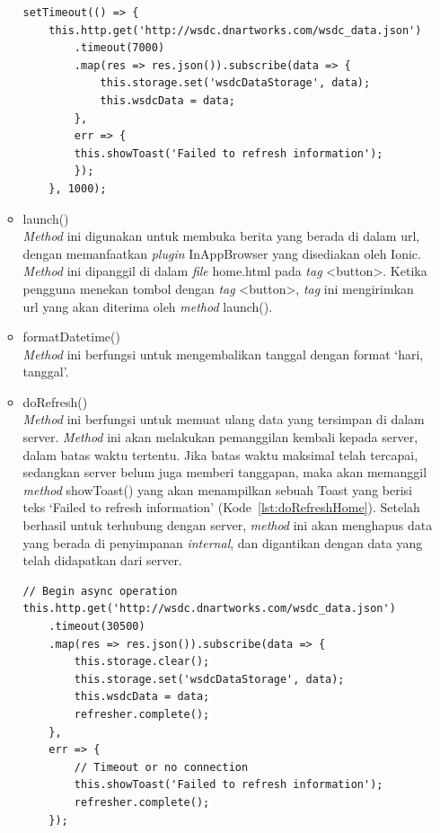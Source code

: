 \begin{itemize}
\begin{itemize}
\newpage		
		
		\begin{lstlisting}[language=html, label={lst:setTimeOutHome}, caption=Perintah setTimeout() pada Home]
setTimeout(() => {
	this.http.get('http://wsdc.dnartworks.com/wsdc_data.json')
		.timeout(7000)
		.map(res => res.json()).subscribe(data => {
       		this.storage.set('wsdcDataStorage', data);
        	this.wsdcData = data;
      	},
      	err => {
        this.showToast('Failed to refresh information');
      	});
    }, 1000);
\end{lstlisting}
		\item launch() \\
		\textit{Method} ini digunakan untuk membuka berita yang berada di dalam url, dengan memanfaatkan \textit{plugin} InAppBrowser yang disediakan oleh Ionic. \textit{Method} ini dipanggil di dalam \textit{file} home.html pada \textit{tag} <button>. Ketika pengguna menekan tombol dengan \textit{tag} <button>, \textit{tag} ini mengirimkan url yang akan diterima oleh \textit{method} launch(). 
		\item formatDatetime() \\
		\textit{Method} ini berfungsi untuk mengembalikan tanggal dengan format `hari, tanggal'.
		\item doRefresh() \\
		\textit{Method} ini berfungsi untuk memuat ulang data yang tersimpan di dalam server. \textit{Method} ini akan melakukan pemanggilan kembali kepada server, dalam batas waktu tertentu. Jika batas waktu maksimal telah tercapai, sedangkan server belum juga memberi tanggapan, maka akan memanggil \textit{method} showToast() yang akan menampilkan sebuah Toast yang berisi teks `Failed to refresh information' (Kode~\ref{lst:doRefreshHome}). Setelah berhasil untuk terhubung dengan server, \textit{method} ini akan menghapus data yang berada di penyimpanan \textit{internal}, dan digantikan dengan data yang telah didapatkan dari server.

\begin{lstlisting}[language=html, label={lst:doRefreshHome}, caption=\textit{Method} doRefresh() pada Home]
// Begin async operation
this.http.get('http://wsdc.dnartworks.com/wsdc_data.json')
	.timeout(30500)
    .map(res => res.json()).subscribe(data => {
    	this.storage.clear();
    	this.storage.set('wsdcDataStorage', data);
    	this.wsdcData = data;
    	refresher.complete();
    },
    err => {
    	// Timeout or no connection
        this.showToast('Failed to refresh information');
        refresher.complete();
    });


\end{lstlisting}
\end{itemize}
\end{itemize}
